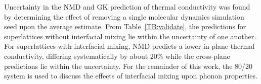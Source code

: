 \documentclass[aps,prb,preprint,preprintnumbers,amsmath,amssymb,floatfix,superscriptaddress]{revtex4}
\begin{document}
Uncertainty in the NMD and GK prediction of thermal conductivity was found by determining the effect of removing a single molecular dynamics simulation seed upon the average estimate. From Table~\ref{TB:validate}, the predictions for superlattices without interfacial mixing lie within the uncertainty of one another. For superlattices with interfacial mixing, NMD predicts a lower in-plane thermal conductivity, differing systematically by about 20\% while the cross-plane predictions lie within the uncertainty. For the remainder of this work, the 80/20 system is used to discuss the effects of interfacial mixing upon phonon properties.
\begin{comment}
\begin{table}
\begin{center}
\begin{tabular}{lcc}
\hline\hline\noalign{\smallskip}
&\multicolumn{2}{c}{Method} \\
\cline{2-3}\noalign{\smallskip}
$k$ & NMD  & GK  \\
\noalign{\smallskip}\hline\noalign{\smallskip}
Cross-Plane Perfect  & 0.24 $\pm$ 0.02 & 0.22 $\pm$ 0.04\\
Cross-Plane 80/20    & 0.17  $\pm$ 0.01   &   0.18 $\pm$ 0.02 \\
Cross-Plane 60/40    & 0.18  $\pm$ 0.01   &   0.19 $\pm$ 0.02 \\
In-Plane Perfect   & 0.52 $\pm$ 0.03 & 0.54 $\pm$ 0.03  \\
In-Plane 80/20  & 0.25 $\pm$ 0.02 & 0.30 $\pm$ 0.01  \\
In-Plane 60/40   & 0.20 $\pm$ 0.02 & 0.26 $\pm$ 0.01  \\
\noalign{\smallskip}\hline\hline
\end{tabular}
\end{center}
\renewcommand{\table}{Table.}
\caption{A comparison of the thermal conductivity predictions [$Wm^{-1}K^{-1}$] predictions for a $4\times4$ superlattice.}
\label{TB:validate}
\end{table}
\end{comment}

%
\end{document}
